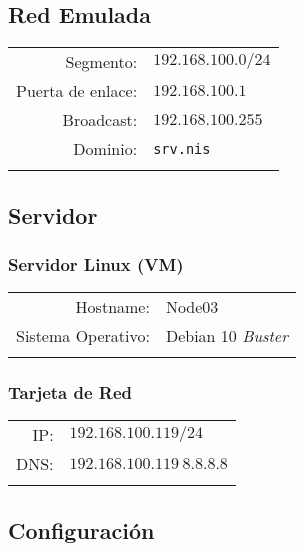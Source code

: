 \documentclass[../main.tex]{subfiles}
\begin{document}
\subsection{Red Emulada}\label{sec:red_emu}
\begin{table}[H]
  \centering
  \begin{tabular}{rl}
    \hline{}
    Segmento:&$192.168.100.0/24$\\
    Puerta de enlace:&$192.168.100.1$\\
    Broadcast:&$192.168.100.255$\\
    Dominio:&\texttt{srv.nis}\\
    \hline{}
  \end{tabular}
\end{table}

\subsection{Servidor}\label{sec:servidor}

\subsubsection{Servidor Linux (VM)}\label{sec:slvm}
\begin{table}[H]
  \centering
  \begin{tabular}{rl}
    \hline{}
    Hostname: &Node03\\
    Sistema Operativo: & Debian 10 \textit{Buster}\\
    \hline{}
  \end{tabular}
\end{table}
\vfill{}
\subsubsection{Tarjeta de Red}\label{sec:tr}
\begin{table}[H]
  \centering
  \begin{tabular}{rl}
    \hline{}
    IP:&$192.168.100.119/24$\\
    DNS:&$192.168.100.119\ 8.8.8.8$\\
    \hline{}
  \end{tabular}
\end{table}

\subsection{Configuración}\label{sec:serv_conf}
\end{document}
